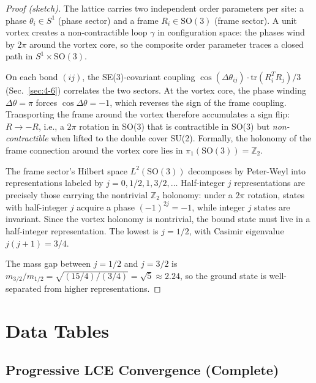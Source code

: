 \documentclass[aps,prd,onecolumn,superscriptaddress,floatfix,12pt]{revtex4-2}
\begin{document}
\begin{proof}[Proof (sketch)]
The lattice carries two independent order parameters per site: a phase $\theta_i \in S^1$ (phase sector) and a frame $R_i \in \text{SO}(3)$ (frame sector). A unit vortex creates a non-contractible loop $\gamma$ in configuration space: the phases wind by $2\pi$ around the vortex core, so the composite order parameter traces a closed path in $S^1 \times \text{SO}(3)$.

On each bond $(ij)$, the SE(3)-covariant coupling $\cos(\Delta\theta_{ij}) \cdot \text{tr}(R_i^T R_j)/3$ (Sec.~\ref{sec:4-6}) correlates the two sectors. At the vortex core, the phase winding $\Delta\theta = \pi$ forces $\cos\Delta\theta = -1$, which reverses the sign of the frame coupling. Transporting the frame around the vortex therefore accumulates a sign flip: $R \to -R$, i.e., a $2\pi$ rotation in SO(3) that is contractible in SO(3) but \emph{non-contractible} when lifted to the double cover SU(2). Formally, the holonomy of the frame connection around the vortex core lies in $\pi_1(\text{SO}(3)) = \mathbb{Z}_2$.

The frame sector's Hilbert space $L^2(\text{SO}(3))$ decomposes by Peter-Weyl into representations labeled by $j = 0, 1/2, 1, 3/2, \ldots$ Half-integer $j$ representations are precisely those carrying the nontrivial $\mathbb{Z}_2$ holonomy: under a $2\pi$ rotation, states with half-integer $j$ acquire a phase $(-1)^{2j} = -1$, while integer $j$ states are invariant. Since the vortex holonomy is nontrivial, the bound state must live in a half-integer representation. The lowest is $j = 1/2$, with Casimir eigenvalue $j(j+1) = 3/4$.

The mass gap between $j = 1/2$ and $j = 3/2$ is $m_{3/2}/m_{1/2} = \sqrt{(15/4)/(3/4)} = \sqrt{5} \approx 2.24$, so the ground state is well-separated from higher representations.
\end{proof}

\section{Data Tables}\label{sec:B}

\subsection{Progressive LCE Convergence (Complete)}\label{sec:B1}
\end{document}
